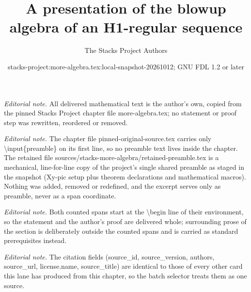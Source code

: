\documentclass[10pt,a4paper]{amsart}
\title{A presentation of the blowup algebra of an H1-regular sequence}
\author{The Stacks Project Authors}
\date{stacks-project:more-algebra.tex:local-snapshot-20261012; GNU FDL 1.2 or later}
\theoremstyle{plain}
\theoremstyle{definition}
\theoremstyle{remark}
\numberwithin{equation}{subsection}
\begin{document}
\maketitle
\setcounter{subsection}{1}
\noindent\textit{Editorial note.} All delivered mathematical text is the author's own, copied from the pinned Stacks Project chapter file more-algebra.tex; no statement or proof step was rewritten, reordered or removed.\par\medskip
\noindent\textit{Editorial note.} The chapter file pinned-original-source.tex carries only \textbackslash{}input\{preamble\} on its first line, so no preamble text lives inside the chapter. The retained file sources/stacks-more-algebra/retained-preamble.tex is a mechanical, line-for-line copy of the project's single shared preamble as staged in the snapshot (Xy-pic setup plus theorem declarations and mathematical macros). Nothing was added, removed or redefined, and the excerpt serves only as preamble, never as a span coordinate.\par\medskip
\noindent\textit{Editorial note.} Both counted spans start at the \textbackslash{}begin line of their environment, so the statement and the author's proof are delivered whole; surrounding prose of the section is deliberately outside the counted spans and is carried as standard prerequisites instead.\par\medskip
\noindent\textit{Editorial note.} The citation fields (source\_id, source\_version, authors, source\_url, license.name, source\_title) are identical to those of every other card this lane has produced from this chapter, so the batch selector treats them as one source.\par\medskip
\end{document}
